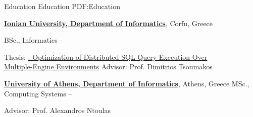 
\Section
{Education}
{Education}
{PDF:Education}

\Entry
\href{http://www.ionio.gr}
{\textbf{Ionian University, Department of Informatics}},
Corfu, Greece

\Gap
\BulletItem
BSc., Informatics
\hfill
{} --
\begin{Detail}
\SubBulletItem
Thesis:
\href{http://www.cslab.ece.ntua.gr/~vgian/papers/thesis.pdf}
{: Optimization of Distributed SQL Query Execution Over \\Multiple-Engine Environments}
\SubBulletItem
Advisor:
Prof. Dimitrios Tsoumakos
\end{Detail}

\Entry
\href{http://di.uoa.gr/eng}
{\textbf{University of Athens, Department of Informatics}},
Athens, Greece
\Gap
\BulletItem
MSc., Computing Systems
\hfill
{} --
\begin{Detail}
\SubBulletItem
Advisor:
Prof. Alexandros Ntoulas
\end{Detail}